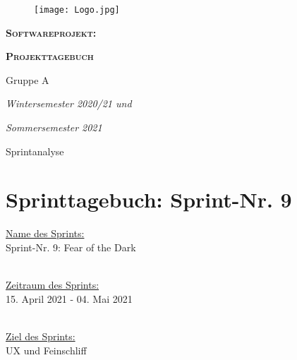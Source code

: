 \documentclass[12pt,a4paper, oneside]{article}
\author{Uni Oldenburg, SWP2020 Gruppe A}
\begin{document}
    \begin{titlepage}
        \pagestyle{empty}
        \begin{center}

            \begin{figure}[h]
                \centering
                \texttt{[image: Logo.jpg]}
            \end{figure}

            \bigskip \bigskip \noindent
            \textsc{\textbf{\LARGE Softwareprojekt:}} \par \bigskip \noindent
            \textsc{\textbf{\LARGE Projekttagebuch}}


            \par \bigskip \bigskip \bigskip \bigskip \bigskip \noindent
            {\Large Gruppe A} \par \medskip \noindent

            \par \bigskip \bigskip \bigskip \bigskip \bigskip \bigskip \noindent
            \textit{\Large Wintersemester 2020/21 und} \par \noindent
            \textit{\Large Sommersemester 2021}

            \par \bigskip \bigskip \bigskip \bigskip \bigskip \bigskip \noindent
            \par \bigskip \bigskip \bigskip \noindent
            {\Large Sprintanalyse} \par \medskip \noindent

        \end{center}
    \end{titlepage}

    \tableofcontents
    \pagebreak



    \section{Sprinttagebuch: Sprint-Nr. 9}
    \underline{Name des Sprints:}
    \\Sprint-Nr. 9: Fear of the Dark

    \noindent
    \\
    \underline{Zeitraum des Sprints:}
    \\15. April 2021 - 04. Mai 2021

    \noindent
    \\
    \underline{Ziel des Sprints:}
    \\UX und Feinschliff
\end{document}
